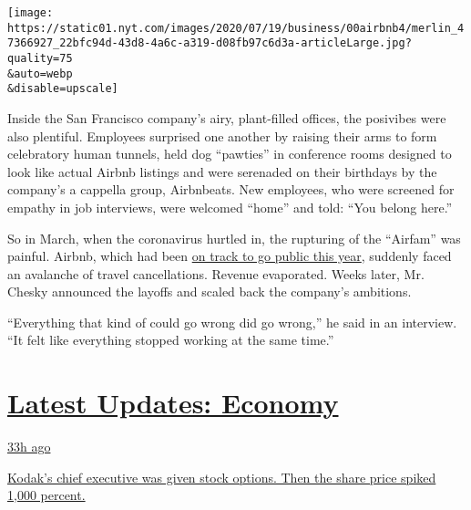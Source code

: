 \texttt{[image: https://static01.nyt.com/images/2020/07/19/business/00airbnb4/merlin\_47366927\_22bfc94d-43d8-4a6c-a319-d08fb97c6d3a-articleLarge.jpg?quality=75\\\&auto=webp\\\&disable=upscale]}

Inside the San Francisco company's airy, plant-filled offices, the
posivibes were also plentiful. Employees surprised one another by
raising their arms to form celebratory human tunnels, held dog
``pawties'' in conference rooms designed to look like actual Airbnb
listings and were serenaded on their birthdays by the company's a
cappella group, Airbnbeats. New employees, who were screened for empathy
in job interviews, were welcomed ``home'' and told: ``You belong here.''

So in March, when the coronavirus hurtled in, the rupturing of the
``Airfam'' was painful. Airbnb, which had been
\href{https://www.nytimes.com/2019/09/19/technology/airbnb-ipo-2020.html}{on
track to go public this year}, suddenly faced an avalanche of travel
cancellations. Revenue evaporated. Weeks later, Mr. Chesky announced the
layoffs and scaled back the company's ambitions.

``Everything that kind of could go wrong did go wrong,'' he said in an
interview. ``It felt like everything stopped working at the same time.''

\hypertarget{latest-updates-economy}{%
\section{\texorpdfstring{\href{https://www.nytimes.com/live/2020/07/31/business/stock-market-today-coronavirus?action=click\&pgtype=Article\&state=default\&region=MAIN_CONTENT_1\&context=storylines_live_updates}{Latest
Updates:
Economy}}{Latest Updates: Economy}}\label{latest-updates-economy}}

\href{https://www.nytimes.com/live/2020/07/31/business/stock-market-today-coronavirus?action=click\&pgtype=Article\&state=default\&region=MAIN_CONTENT_1\&context=storylines_live_updates\#kodaks-chief-executive-was-given-stock-options-then-the-share-price-spiked-1000-percent}{33h
ago}

\href{https://www.nytimes.com/live/2020/07/31/business/stock-market-today-coronavirus?action=click\&pgtype=Article\&state=default\&region=MAIN_CONTENT_1\&context=storylines_live_updates\#kodaks-chief-executive-was-given-stock-options-then-the-share-price-spiked-1000-percent}{Kodak's
chief executive was given stock options. Then the share price spiked
1,000 percent.}

